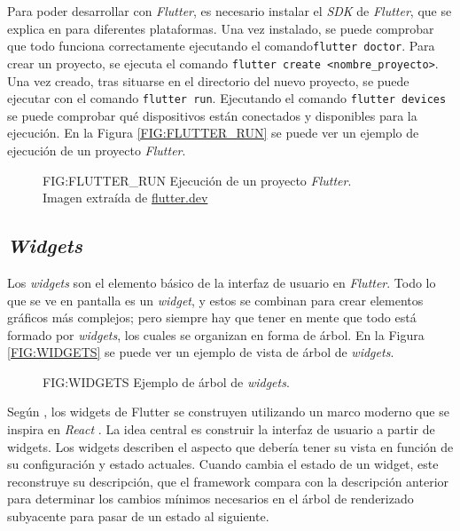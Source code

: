 Para poder desarrollar con \textit{Flutter}, es necesario instalar el \textit{SDK} de 
\textit{Flutter}, que se explica en \cite{flutter_install} para diferentes plataformas. Una vez instalado, se puede
comprobar que todo funciona correctamente ejecutando el comando\texttt{flutter doctor}. Para crear un proyecto, 
se ejecuta el comando \texttt{flutter create <nombre\_proyecto>}.
Una vez creado, tras situarse en el directorio del nuevo proyecto, se puede ejecutar
con el comando \texttt{flutter run}. Ejecutando el comando \texttt{flutter devices} se puede
comprobar qué dispositivos están conectados y disponibles para la ejecución. En la Figura \ref{FIG:FLUTTER_RUN} 
se puede ver un ejemplo de ejecución de un proyecto \textit{Flutter}.

\begin{figure}[Ejecución de un proyecto \textit{Flutter}]{FIG:FLUTTER_RUN}
  {Ejecución de un proyecto \textit{Flutter}. \\
   \footnotesize{
    Imagen extraída de \href{
      https://docs.flutter.dev/get-started/test-drive?tab=terminal
    }{flutter.dev}
    }
  }
\end{figure}


\subsection{\textit{Widgets}\label{SEC:WIDGETS}}

Los \textit{widgets} son el elemento básico de la interfaz de usuario en \textit{Flutter}. Todo lo que se ve
en pantalla es un \textit{widget}, y estos se combinan para crear elementos gráficos más complejos; pero 
siempre hay que tener en mente que todo está formado por \textit{widgets}, los cuales se organizan en forma de
árbol. En la Figura \ref{FIG:WIDGETS} se puede ver un ejemplo de vista de árbol de \textit{widgets}.

\begin{figure}[Ejemplo de árbol de \textit{widgets}]{FIG:WIDGETS}
  {Ejemplo de árbol de \textit{widgets}.}
\end{figure}

Según \cite{flutter_ui}, los widgets de Flutter se construyen utilizando un marco moderno que se inspira en \textit{React} \cite{react}. 
La idea central es construir la interfaz de usuario a partir de widgets. Los widgets describen el aspecto que debería 
tener su vista en función de su configuración y estado actuales. Cuando cambia el estado de un widget, este reconstruye 
su descripción, que el framework compara con la descripción anterior para determinar los cambios mínimos necesarios en el 
árbol de renderizado subyacente para pasar de un estado al siguiente.

